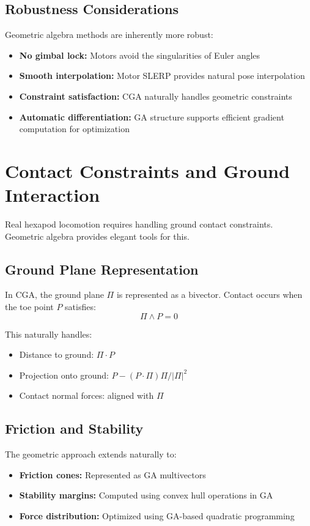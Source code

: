 \documentclass[11pt]{article}
\begin{document}
\subsection{Robustness Considerations}

Geometric algebra methods are inherently more robust:

\begin{itemize}
    \item \textbf{No gimbal lock:} Motors avoid the singularities of Euler angles
    \item \textbf{Smooth interpolation:} Motor SLERP provides natural pose interpolation
    \item \textbf{Constraint satisfaction:} CGA naturally handles geometric constraints
    \item \textbf{Automatic differentiation:} GA structure supports efficient gradient computation for optimization
\end{itemize}

\section{Contact Constraints and Ground Interaction}

Real hexapod locomotion requires handling ground contact constraints. Geometric algebra provides elegant tools for this.

\subsection{Ground Plane Representation}

In CGA, the ground plane $\Pi$ is represented as a bivector. Contact occurs when the toe point $P$ satisfies:
\[\Pi \wedge P = 0\]

This naturally handles:
\begin{itemize}
    \item Distance to ground: $\Pi \cdot P$
    \item Projection onto ground: $P - (P \cdot \Pi) \Pi / |\Pi|^2$
    \item Contact normal forces: aligned with $\Pi$
\end{itemize}

\subsection{Friction and Stability}

The geometric approach extends naturally to:
\begin{itemize}
    \item \textbf{Friction cones:} Represented as GA multivectors
    \item \textbf{Stability margins:} Computed using convex hull operations in GA
    \item \textbf{Force distribution:} Optimized using GA-based quadratic programming
\end{itemize}
\end{document}
